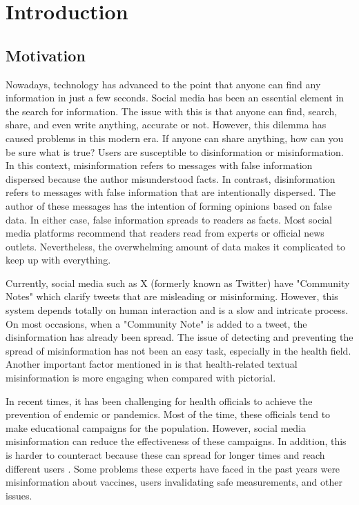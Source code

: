 

\chapter{Introduction}

\section{Motivation}

\noindent Nowadays, technology has advanced to the point that anyone can find any information in just a few seconds. Social media has been an essential
element in the search for information. The issue with this is that anyone can find, search, share, and even write anything, accurate or not. However, this dilemma
has caused problems in this modern era. If anyone can share anything, how can you be sure what is true? Users are susceptible to disinformation or misinformation.
In this context, misinformation refers to messages with false information dispersed because the author misunderstood facts. In contrast, disinformation refers to
messages with false information that are intentionally dispersed. The author of these messages has the intention of forming opinions based on false data. In either
case, false information spreads to readers as facts. Most social media platforms recommend that readers read from experts or official news outlets. Nevertheless,
the overwhelming amount of data makes it complicated to keep up with everything.

Currently, social media such as X (formerly known as Twitter) have "Community Notes" which clarify tweets that are misleading or misinforming. However, this system
depends totally on human interaction and is a slow and intricate process. On most occasions, when a "Community Note" is added to a tweet, the disinformation has
already been spread. The issue of detecting and preventing the spread of misinformation has not been an easy task, especially in the health field. Another important
factor mentioned in \cite{article} is that health-related textual misinformation is more engaging when compared with pictorial.

In recent times, it has been challenging for health officials to achieve the prevention of endemic or pandemics. Most of the time, these officials tend to make educational
campaigns for the population. However, social media misinformation can reduce the effectiveness of these campaigns. In addition, this is harder to counteract because
these can spread for longer times and reach different users \cite{article}. Some problems these experts have faced in the past years were misinformation
about vaccines, users invalidating safe measurements, and other issues.

